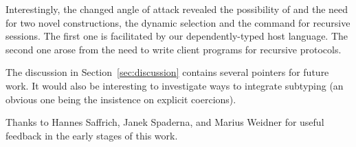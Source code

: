 \documentclass[acmsmall,screen]{acmart}
\begin{document}
Interestingly, the changed angle of attack revealed the possibility of
and the need for two novel constructions, the dynamic selection and
the {\AUNROLL} command for recursive sessions. The first one is
facilitated by our dependently-typed host language. The second one
arose from the need to write client programs for recursive protocols. 

The discussion in Section~\ref{sec:discussion} contains several
pointers for future work. It would also be interesting to investigate
ways to integrate subtyping (an obvious one being the insistence on
explicit coercions).

\begin{acks}
  Thanks to Hannes Saffrich, Janek Spaderna, and Marius Weidner for useful feedback in
  the early stages of this work.
\end{acks}



\end{document}
